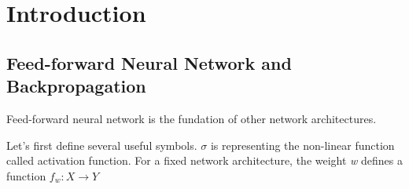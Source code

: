 \documentclass[11pt]{article}
\author{Yiping Deng}
\date{\today}
\title{}
\begin{document}
\tableofcontents

\section{Introduction}
\label{sec:org213f3d2}
\subsection{Feed-forward Neural Network and Backpropagation}
\label{sec:org4942dfc}
Feed-forward neural network is the fundation of other network architectures.

Let's first define several useful symbols. \(\sigma\) is representing the non-linear function
called activation function.
For a fixed network architecture, the weight \emph{w} defines a function \(f_w: X \to Y\)
\end{document}
